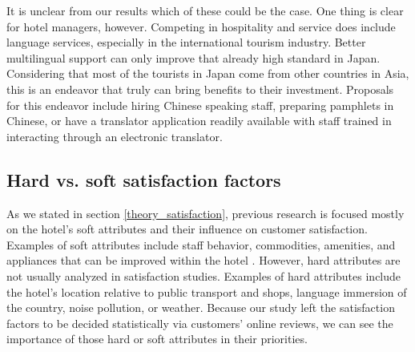 \documentclass[smallextended,natbib]{svjour3}       %
\begin{document}
    It is unclear from our results which of these could be the case. One thing is clear for hotel managers, however. Competing in hospitality and service does include language services, especially in the international tourism industry. Better multilingual support can only improve that already high standard in Japan. Considering that most of the tourists in Japan come from other countries in Asia, this is an endeavor that truly can bring benefits to their investment. Proposals for this endeavor include hiring Chinese speaking staff, preparing pamphlets in Chinese, or have a translator application readily available with staff trained in interacting through an electronic translator.

  \subsection{Hard vs. soft satisfaction factors}\label{disc:hard_soft}

    As we stated in section \ref{theory_satisfaction}, previous research is focused mostly on the hotel's soft attributes and their influence on customer satisfaction. Examples of soft attributes include staff behavior, commodities, amenities, and appliances that can be improved within the hotel \cite[e.g.][]{shanka2004,choi2001}. However, hard attributes are not usually analyzed in satisfaction studies. Examples of hard attributes include the hotel's location relative to public transport and shops, language immersion of the country, noise pollution, or weather. Because our study left the satisfaction factors to be decided statistically via customers’ online reviews, we can see the importance of those hard or soft attributes in their priorities.
\end{document}
